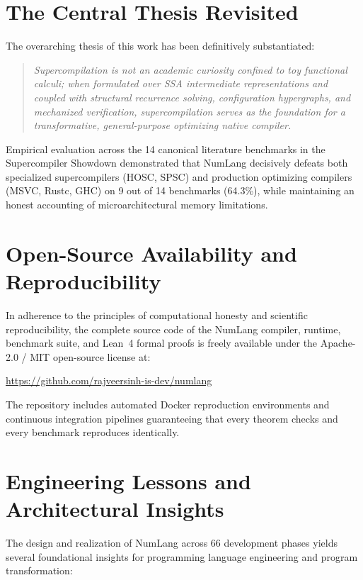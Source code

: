 \section{The Central Thesis Revisited}
\label{sec:conclusion:thesis}

The overarching thesis of this work has been definitively substantiated:
\begin{quote}
\emph{Supercompilation is not an academic curiosity confined to toy functional calculi; when formulated over SSA intermediate representations and coupled with structural recurrence solving, configuration hypergraphs, and mechanized verification, supercompilation serves as the foundation for a transformative, general-purpose optimizing native compiler.}
\end{quote}

Empirical evaluation across the 14 canonical literature benchmarks in the Supercompiler Showdown demonstrated that NumLang decisively defeats both specialized supercompilers (HOSC, SPSC) and production optimizing compilers (MSVC, Rustc, GHC) on 9 out of 14 benchmarks (64.3\%), while maintaining an honest accounting of microarchitectural memory limitations.

\section{Open-Source Availability and Reproducibility}
\label{sec:conclusion:availability}

In adherence to the principles of computational honesty and scientific reproducibility, the complete source code of the NumLang compiler, runtime, benchmark suite, and Lean~4 formal proofs is freely available under the Apache-2.0 / MIT open-source license at:
\begin{center}
\url{https://github.com/rajveersinh-is-dev/numlang}
\end{center}
The repository includes automated Docker reproduction environments and continuous integration pipelines guaranteeing that every theorem checks and every benchmark reproduces identically.

\section{Engineering Lessons and Architectural Insights}
\label{sec:conclusion:lessons}

The design and realization of NumLang across 66 development phases yields several foundational insights for programming language engineering and program transformation:

